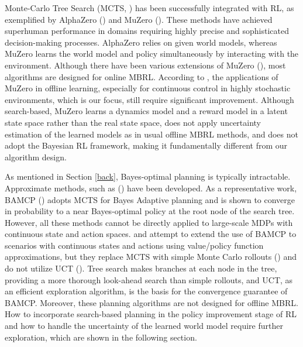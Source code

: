 Monte-Carlo Tree Search (MCTS, \cite{browne2012survey}) has been successfully integrated with RL, as exemplified by AlphaZero (\cite{DBLP:journals/corr/abs-1712-01815}) and MuZero (\cite{DBLP:journals/nature/SchrittwieserAH20}). These methods have achieved superhuman performance in domains requiring highly precise and sophisticated decision-making processes. 
AlphaZero relies on given world models, whereas MuZero learns the world model and policy simultaneously by interacting with the environment. Although there have been various extensions of MuZero (\cite{DBLP:conf/icml/HubertSABSS21, DBLP:conf/nips/SchrittwieserHM21, DBLP:conf/nips/YeLKAG21, DBLP:conf/iclr/DanihelkaGSS22, DBLP:conf/iclr/AntonoglouSOHS22, oren2022mcts, DBLP:journals/corr/abs-2305-17327, zhao2024a}), most algorithms are designed for online MBRL. According to \cite{DBLP:conf/nips/NiuPYLZRHLL23}, the applications of MuZero in offline learning, especially for continuous control in highly stochastic environments, which is our focus, still require significant improvement. Although search-based, MuZero learns a dynamics model and a reward model in a latent state space rather than the real state space, does not apply uncertainty estimation of the learned models as in usual offline MBRL methods, and does not adopt the Bayesian RL framework, making it fundamentally different from our algorithm design.

As mentioned in Section \ref{back}, Bayes-optimal planning is typically intractable. Approximate methods, such as (\cite{DBLP:conf/uai/AsmuthLLNW09, DBLP:conf/uai/SorgSL10, DBLP:conf/pkdd/CastroP10, asmuth2011approaching, DBLP:conf/icml/WangWHL12, DBLP:conf/adprl/FonteneauBM13, DBLP:journals/jair/GuezSD13, DBLP:journals/iet-cps/SladeSK20}) have been developed. As a representative work, BAMCP (\cite{DBLP:journals/jair/GuezSD13}) adopts MCTS for Bayes Adaptive planning and is shown to converge in probability to a near Bayes-optimal policy at the root node of the search tree. However, all these methods cannot be directly applied to large-scale MDPs with continuous state and action spaces. \cite{DBLP:conf/nips/GuezHSD14} and \cite{DBLP:journals/corr/abs-2010-15948} attempt to extend the use of BAMCP to scenarios with continuous states and actions using value/policy function approximations, but they replace MCTS with simple Monte Carlo rollouts (\cite{DBLP:journals/heuristics/BertsekasC99}) and do not utilize UCT (\cite{DBLP:conf/ecml/KocsisS06}). Tree search makes branches at each node in the tree, providing a more thorough look-ahead search than simple rollouts, and UCT, as an efficient exploration algorithm, is the basis for the convergence guarantee of BAMCP. Moreover, these planning algorithms are not designed for offline MBRL. How to incorporate search-based planning in the policy improvement stage of RL and how to handle the uncertainty of the learned world model require further exploration, which are shown in the following section.
